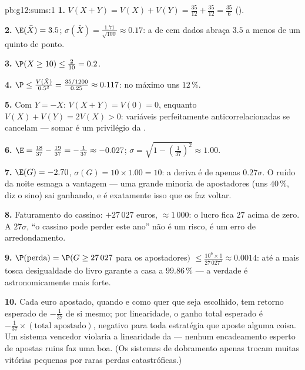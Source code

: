 \begin{solution}{pb:g12:sums:1}
\textbf{1.} $V(X + Y) = V(X) + V(Y) = \frac{35}{12} +
\frac{35}{12} = \frac{35}{6}$ ().

\textbf{2.} $\E(\bar X) = 3.5$;
$\sigma(\bar X) = \frac{1.71}{\sqrt{100}} \approx 0.17$: a
 de cem dados abraça $3.5$ a menos de um quinto de ponto.

\textbf{3.} $\P(X \geq 10) \leq \frac{2}{10} = 0.2$.

\textbf{4.} $\P \leq \frac{V(\bar X)}{0.5^2} =
\frac{35/1200}{0.25} \approx 0.117$: no máximo uns
$12\,\%$.

\textbf{5.} Com $Y = -X$: $V(X + Y) = V(0) = 0$, enquanto
$V(X) + V(Y) = 2V(X) > 0$: variáveis perfeitamente
anticorrelacionadas se cancelam --- somar  é um
privilégio da .

\textbf{6.} $\E = \frac{18}{37} - \frac{19}{37} =
-\frac{1}{37} \approx -0.027$;
$\sigma = \sqrt{1 - \left(\frac{1}{37}\right)^2} \approx
1.00$.

\textbf{7.} $\E(G) = -2.70$, $\sigma(G) = 10 \times 1.00 =
10$: a deriva é de apenas $0.27\sigma$. O ruído da noite
esmaga a vantagem --- uma grande minoria de apostadores (uns
$40\,\%$, diz o sino) sai ganhando, e é exatamente isso que os
faz voltar.

\textbf{8.} Faturamento do cassino:  $+27\,027$
euros,  $\approx 1\,000$: o lucro fica $27$
 acima de zero. A $27\sigma$, ``o cassino pode
perder este ano'' não é um risco, é um erro de
arredondamento.

\textbf{9.} $\P(\text{perda}) = \P(G \geq 27\,027$ para os
apostadores$)$ $\leq \frac{10^6 \times 1}{27\,027^2} \approx
0.0014$: até a mais tosca desigualdade do livro garante a casa
a $99.86\,\%$ --- a verdade é astronomicamente mais forte.

\textbf{10.} Cada euro apostado, quando e como quer que seja
escolhido, tem retorno esperado de $-\frac{1}{37}$ de si
mesmo; por linearidade, o ganho total esperado é
$-\frac{1}{37} \times (\text{total apostado})$, negativo para
toda estratégia que aposte alguma coisa. Um sistema vencedor
violaria a linearidade da  --- nenhum encadeamento
esperto de apostas ruins faz uma boa. (Os sistemas de
dobramento apenas trocam muitas vitórias pequenas por raras
perdas catastróficas.)


\end{solution}
